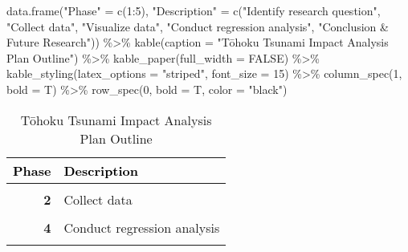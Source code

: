 \documentclass[
]{article}
\newenvironment{Shaded}{\begin{snugshade}}{\end{snugshade}}
\newcommand{\AttributeTok}[1]{\textcolor[rgb]{0.77,0.63,0.00}{#1}}
\newcommand{\ConstantTok}[1]{\textcolor[rgb]{0.00,0.00,0.00}{#1}}
\newcommand{\DecValTok}[1]{\textcolor[rgb]{0.00,0.00,0.81}{#1}}
\newcommand{\FunctionTok}[1]{\textcolor[rgb]{0.00,0.00,0.00}{#1}}
\newcommand{\NormalTok}[1]{#1}
\newcommand{\OtherTok}[1]{\textcolor[rgb]{0.56,0.35,0.01}{#1}}
\newcommand{\SpecialCharTok}[1]{\textcolor[rgb]{0.00,0.00,0.00}{#1}}
\newcommand{\StringTok}[1]{\textcolor[rgb]{0.31,0.60,0.02}{#1}}
\begin{document}
\begin{Shaded}
\begin{Highlighting}[]
\FunctionTok{data.frame}\NormalTok{(}\StringTok{"Phase"} \OtherTok{=} \FunctionTok{c}\NormalTok{(}\DecValTok{1}\SpecialCharTok{:}\DecValTok{5}\NormalTok{),}
           \StringTok{"Description"} \OtherTok{=} \FunctionTok{c}\NormalTok{(}\StringTok{"Identify research question"}\NormalTok{,}
                             \StringTok{"Collect data"}\NormalTok{,}
                             \StringTok{"Visualize data"}\NormalTok{,}
                             \StringTok{"Conduct regression analysis"}\NormalTok{,}
                             \StringTok{"Conclusion \& Future Research"}\NormalTok{)) }\SpecialCharTok{\%\textgreater{}\%} 
  \FunctionTok{kable}\NormalTok{(}\AttributeTok{caption =} \StringTok{"Tōhoku Tsunami Impact Analysis Plan Outline"}\NormalTok{) }\SpecialCharTok{\%\textgreater{}\%}
  \FunctionTok{kable\_paper}\NormalTok{(}\AttributeTok{full\_width =} \ConstantTok{FALSE}\NormalTok{) }\SpecialCharTok{\%\textgreater{}\%}
  \FunctionTok{kable\_styling}\NormalTok{(}\AttributeTok{latex\_options =} \StringTok{"striped"}\NormalTok{,}
                \AttributeTok{font\_size =} \DecValTok{15}\NormalTok{) }\SpecialCharTok{\%\textgreater{}\%} 
  \FunctionTok{column\_spec}\NormalTok{(}\DecValTok{1}\NormalTok{, }\AttributeTok{bold =}\NormalTok{ T) }\SpecialCharTok{\%\textgreater{}\%}
  \FunctionTok{row\_spec}\NormalTok{(}\DecValTok{0}\NormalTok{, }\AttributeTok{bold =}\NormalTok{ T, }\AttributeTok{color =} \StringTok{"black"}\NormalTok{)}
\end{Highlighting}
\end{Shaded}

\begin{table}

\caption{\label{tab:unnamed-chunk-3}Tōhoku Tsunami Impact Analysis Plan Outline}
\centering
\fontsize{15}{17}\selectfont
\begin{tabular}[t]{>{}r|l}
\hline
\textcolor{black}{\textbf{Phase}} & \textcolor{black}{\textbf{Description}}\\
\hline
\textbf{\cellcolor{gray!6}{1}} & \cellcolor{gray!6}{Identify research question}\\
\hline
\textbf{2} & Collect data\\
\hline
\textbf{\cellcolor{gray!6}{3}} & \cellcolor{gray!6}{Visualize data}\\
\hline
\textbf{4} & Conduct regression analysis\\
\hline
\textbf{\cellcolor{gray!6}{5}} & \cellcolor{gray!6}{Conclusion \& Future Research}\\
\hline
\end{tabular}
\end{table}
\end{document}
